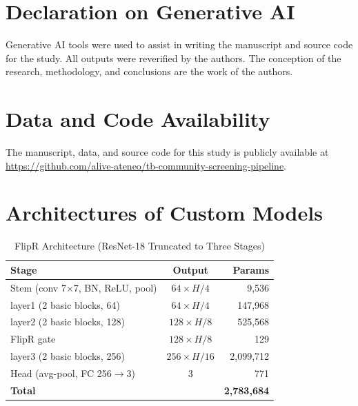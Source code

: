 \documentclass[conference, letterpaper]{IEEEtran}
\begin{document}
\section*{Declaration on Generative AI}

Generative AI tools were used to assist in writing the manuscript and source code for the study. All outputs were reverified by the authors. The conception of the research, methodology, and conclusions are the work of the authors.

\section*{Data and Code Availability}

The manuscript, data, and source code for this study is publicly available at \url{https://github.com/alive-ateneo/tb-community-screening-pipeline}.

\appendices
\section{Architectures of Custom Models}
\label{app:architectures}

\begin{table}[H]
\renewcommand{\arraystretch}{1.2}
\centering
\begin{threeparttable}
\caption{FlipR Architecture (ResNet-18 Truncated to Three Stages)}
\label{tab:arch_flipr}
\footnotesize
\begin{tabularx}{\columnwidth}{@{}X c r@{}}
\toprule
\textbf{Stage} & \textbf{Output} & \textbf{Params} \\
\midrule
Stem (conv 7$\times$7, BN, ReLU, pool) & $64\times H/4$ & 9,536 \\
layer1 (2 basic blocks, 64) & $64\times H/4$ & 147,968 \\
layer2 (2 basic blocks, 128) & $128\times H/8$ & 525,568 \\
FlipR gate & $128\times H/8$ & 129 \\
layer3 (2 basic blocks, 256) & $256\times H/16$ & 2,099,712 \\
Head (avg-pool, FC 256$\to$3) & 3 & 771 \\
\midrule
\textbf{Total} & & \textbf{2,783,684} \\
\bottomrule
\end{tabularx}
\end{threeparttable}
\end{table}
\end{document}

